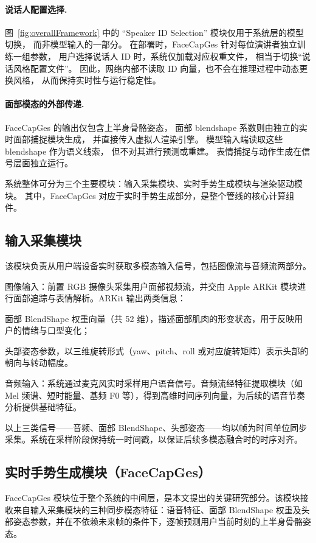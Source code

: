 \paragraph{说话人配置选择.}
图~\ref{fig:overallFramework} 中的 “Speaker ID Selection” 模块仅用于系统层的模型切换，
而非模型输入的一部分。
在部署时，FaceCapGes 针对每位演讲者独立训练一组参数，
用户选择说话人 ID 时，系统仅加载对应权重文件，
相当于切换“说话风格配置文件”。
因此，网络内部不读取 ID 向量，也不会在推理过程中动态更换风格，
从而保持实时性与运行稳定性。

\paragraph{面部模态的外部传递.}
FaceCapGes 的输出仅包含上半身骨骼姿态，
面部 blendshape 系数则由独立的实时面部捕捉模块生成，
并直接传入虚拟人渲染引擎。
模型输入端读取这些 blendshape 作为语义线索，
但不对其进行预测或重建。
表情捕捉与动作生成在信号层面独立运行。

系统整体可分为三个主要模块：输入采集模块、实时手势生成模块与渲染驱动模块。
其中，FaceCapGes 对应于实时手势生成部分，是整个管线的核心计算组件。

\subsection{输入采集模块}

该模块负责从用户端设备实时获取多模态输入信号，包括图像流与音频流两部分。

图像输入：前置 RGB 摄像头采集用户面部视频流，并交由 Apple ARKit 模块进行面部追踪与表情解析。ARKit 输出两类信息：

面部 BlendShape 权重向量（共 52 维），描述面部肌肉的形变状态，用于反映用户的情绪与口型变化；

头部姿态参数，以三维旋转形式（yaw、pitch、roll 或对应旋转矩阵）表示头部的朝向与转动幅度。

音频输入：系统通过麦克风实时采样用户语音信号。音频流经特征提取模块（如 Mel 频谱、短时能量、基频 F0 等），得到高维时间序列向量，为后续的语音节奏分析提供基础特征。

以上三类信号——音频、面部 BlendShape、头部姿态——均以帧为时间单位同步采集。系统在采样阶段保持统一时间戳，以保证后续多模态融合时的时序对齐。

\subsection{实时手势生成模块（FaceCapGes）}

FaceCapGes 模块位于整个系统的中间层，是本文提出的关键研究部分。该模块接收来自输入采集模块的三种同步模态特征：语音特征、面部 BlendShape 权重及头部姿态参数，并在不依赖未来帧的条件下，逐帧预测用户当前时刻的上半身骨骼姿态。

